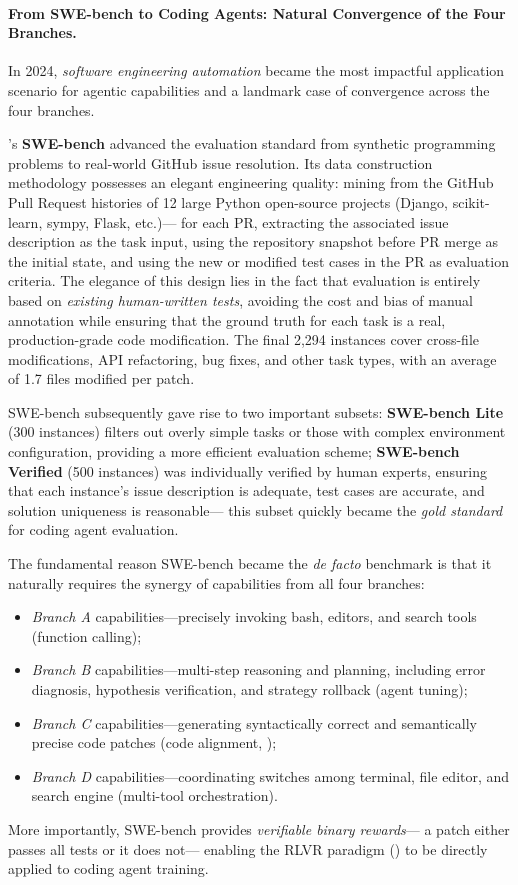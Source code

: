 \paragraph{From SWE-bench to Coding Agents: Natural Convergence of the Four Branches.}
In 2024, \emph{software engineering automation} became the most impactful application scenario for agentic capabilities
and a landmark case of convergence across the four branches.

's \textbf{SWE-bench}
advanced the evaluation standard from synthetic programming problems to real-world GitHub issue resolution.
Its data construction methodology possesses an elegant engineering quality:
mining from the GitHub Pull Request histories of 12 large Python open-source projects
(Django, scikit-learn, sympy, Flask, etc.)---
for each PR, extracting the associated issue description as the task input,
using the repository snapshot before PR merge as the initial state,
and using the new or modified test cases in the PR as evaluation criteria.
The elegance of this design lies in the fact that
evaluation is entirely based on \emph{existing human-written tests},
avoiding the cost and bias of manual annotation
while ensuring that the ground truth for each task is a real, production-grade code modification.
The final 2,294 instances cover cross-file modifications, API refactoring, bug fixes, and other task types,
with an average of 1.7 files modified per patch.

SWE-bench subsequently gave rise to two important subsets:
\textbf{SWE-bench Lite} (300 instances) filters out overly simple tasks or those with complex environment configuration,
providing a more efficient evaluation scheme;
\textbf{SWE-bench Verified} (500 instances) was individually verified by human experts,
ensuring that each instance's issue description is adequate, test cases are accurate, and solution uniqueness is reasonable---
this subset quickly became the \emph{gold standard} for coding agent evaluation.

The fundamental reason SWE-bench became the \emph{de facto} benchmark is that
it naturally requires the synergy of capabilities from all four branches:
\begin{itemize}[leftmargin=*]
  \item \emph{Branch A} capabilities---precisely invoking bash, editors, and search tools (function calling);
  \item \emph{Branch B} capabilities---multi-step reasoning and planning, including error diagnosis, hypothesis verification, and strategy rollback (agent tuning);
  \item \emph{Branch C} capabilities---generating syntactically correct and semantically precise code patches (code alignment, );
  \item \emph{Branch D} capabilities---coordinating switches among terminal, file editor, and search engine (multi-tool orchestration).
\end{itemize}
More importantly, SWE-bench provides \emph{verifiable binary rewards}---
a patch either passes all tests or it does not---
enabling the RLVR paradigm () to be directly applied to coding agent training.

